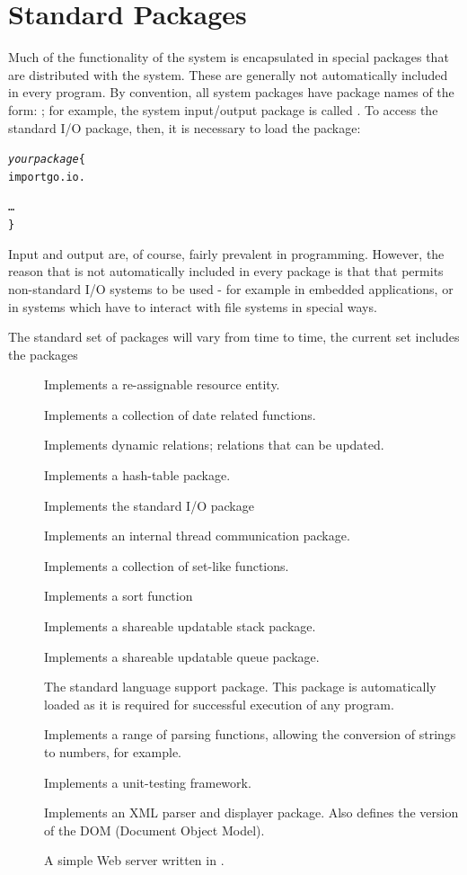 \section{Standard Packages}
Much of the functionality of the \go system is encapsulated in special packages that are distributed with the \go system. These are generally not automatically included in every program. By convention, all \go system packages have package names of the form: ; for example, the system input/output package is called . To access the standard I/O package, then, it is necessary to load the  package:
\begin{alltt}
\emph{yourpackage}\{
  import go.io.
  
  \ldots
\}
\end{alltt}
\begin{aside}
Input and output are, of course, fairly prevalent in programming. However, the reason that  is not automatically included in every package is that that permits non-standard I/O systems to be used - for example in embedded applications, or in systems which have to interact with file systems in special ways.
\end{aside}
The standard set of packages will vary from time to time, the current set includes the packages
\begin{description}
\item[] Implements a re-assignable resource entity.
\item[] Implements a collection of date related functions.
\item[] Implements dynamic relations; relations that can be updated.
\item[] Implements a hash-table package.
\item[] Implements the standard I/O package
\item[] Implements an internal thread communication package.
\item[] Implements a collection of set-like functions.
\item[] Implements a sort function
\item[] Implements a shareable updatable stack package.
\item[] Implements a shareable updatable queue package.
\item[] The standard \go language support package. This package is automatically loaded as it is required for successful execution of any \go program.
\item[] Implements a range of parsing functions, allowing the conversion of strings to numbers, for example.
\item[] Implements a unit-testing framework.
\item[] Implements an XML parser and displayer package. Also defines the \go version of the DOM (Document Object Model).
\item[] A simple Web server written in \go.
\end{description}




